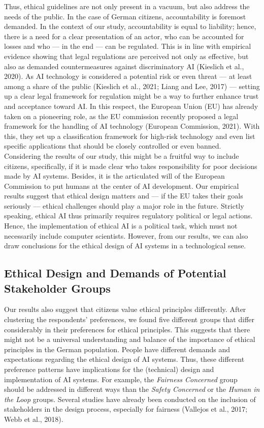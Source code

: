 \documentclass{article}
\begin{document}
Thus, ethical guidelines are not only present in a vacuum, but also
address the needs of the public. In the case of German citizens,
accountability is foremost demanded. In the context of our study,
accountability is equal to liability; hence, there is a need for a clear
presentation of an actor, who can be accounted for losses and who --- in
the end --- can be regulated. This is in line with empirical evidence
showing that legal regulations are perceived not only as effective, but
also as demanded countermeasures against discriminatory AI (Kieslich et
al., 2020). As AI technology is considered a potential risk or even
threat --- at least among a share of the public (Kieslich et al., 2021;
Liang and Lee, 2017) --- setting up a clear legal framework for
regulation might be a way to further enhance trust and acceptance toward
AI. In this respect, the European Union (EU) has already taken on a
pioneering role, as the EU commission recently proposed a legal
framework for the handling of AI technology (European Commission, 2021).
With this, they set up a classification framework for high-risk
technology and even list specific applications that should be closely
controlled or even banned. Considering the results of our study, this
might be a fruitful way to include citizens, specifically, if it is made
clear who takes responsibility for poor decisions made by AI systems.
Besides, it is the articulated will of the European Commission to put
humans at the center of AI development. Our empirical results suggest
that ethical design matters and --- if the EU takes their goals
seriously --- ethical challenges should play a major role in the future.
Strictly speaking, ethical AI thus primarily requires regulatory
political or legal actions. Hence, the implementation of ethical AI is a
political task, which must not necessarily include computer scientists.
However, from our results, we can also draw conclusions for the ethical
design of AI systems in a technological sense.

\hypertarget{ethical-design-and-demands-of-potential-stakeholder-groups}{%
\subsection{Ethical Design and Demands of Potential Stakeholder
Groups}\label{ethical-design-and-demands-of-potential-stakeholder-groups}}

Our results also suggest that citizens value ethical principles
differently. After clustering the respondents' preferences, we found
five different groups that differ considerably in their preferences for
ethical principles. This suggests that there might not be a universal
understanding and balance of the importance of ethical principles in the
German population. People have different demands and expectations
regarding the ethical design of AI systems. Thus, these different
preference patterns have implications for the (technical) design and
implementation of AI systems. For example, the \emph{Fairness Concerned}
group should be addressed in different ways than the \emph{Safety
Concerned} or the \emph{Human in the Loop} groups. Several studies have
already been conducted on the inclusion of stakeholders in the design
process, especially for fairness (Vallejos et al., 2017; Webb et al.,
2018).
\end{document}

